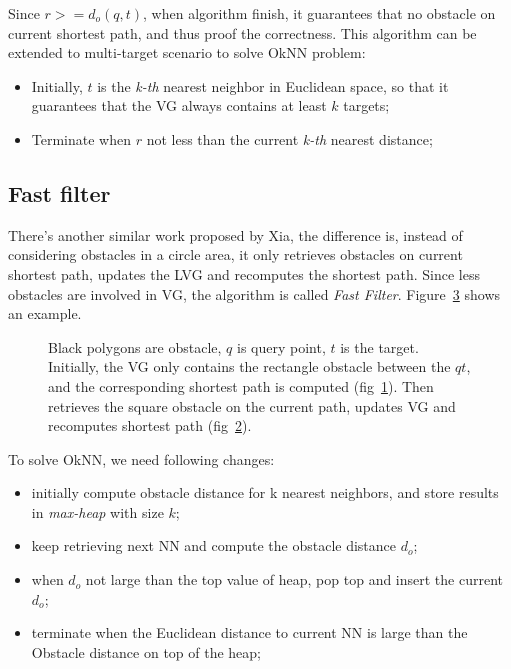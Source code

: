 Since $r>=d_o(q, t)$, when algorithm finish, it guarantees that no obstacle on current shortest
path, and thus proof the correctness. This algorithm can be extended to multi-target
scenario to solve OkNN problem:
\begin{itemize}
  \item Initially, $t$ is the \textit{k-th} nearest neighbor in Euclidean space, so that it
    guarantees that the VG always contains at least $k$ targets;
  \item Terminate when $r$  not less than the current \textit{k-th} nearest distance;
\end{itemize}

\subsection{Fast filter}

There's another similar work proposed by Xia\cite{xia2004fast},
the difference is, instead of considering obstacles in a circle area,
it only retrieves obstacles on current shortest path,
updates the LVG and recomputes the shortest path.
Since less obstacles are involved in VG,
the algorithm is called \textit{Fast Filter}.
Figure~\ref{xia} shows an example.
\begin{figure}[!h]
  \centering
  \begin{subfigure}{.45\linewidth}
    \centering
    
    \caption{}
    \label{xia0}
  \end{subfigure}%
  \begin{subfigure}{.45\linewidth}
    \centering
    
    \caption{}
    \label{xia1}
  \end{subfigure}
  \caption{
    \small Black polygons are obstacle,
    $q$ is query point, $t$ is the target.
    Initially, the VG only contains
    the rectangle obstacle between the $qt$,
    and the corresponding shortest path is computed (fig~\ref{xia0}).
    Then retrieves the square
    obstacle on the current path,
    updates VG and recomputes shortest path (fig~\ref{xia1}).
  }
  \label{xia}
\end{figure}

To solve OkNN, we need following changes:
\begin{itemize}
  \item initially compute obstacle distance for k nearest neighbors, and store results in
    \textit{max-heap} with size $k$;
  \item keep retrieving next NN and compute the obstacle distance $d_o$;
  \item when $d_o$ not large than the top value of heap, pop top and insert the current $d_o$;
  \item terminate when the Euclidean distance to current NN is large than the Obstacle distance
    on top of the heap;
\end{itemize}
